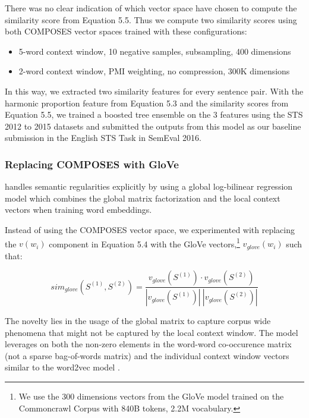 There was no clear indication of which vector space \cite{sultan2015dls} have chosen to compute the similarity score from Equation 5.5. Thus we compute two similarity scores using both COMPOSES vector spaces trained with these configurations:

\begin{itemize}
\item 5-word context window, 10 negative samples, subsampling, 400 dimensions
\item 2-word context window, PMI weighting, no compression, 300K dimensions
\end{itemize}

In this way, we extracted two similarity features for every sentence pair. With the harmonic proportion feature from Equation 5.3 and the similarity scores from Equation 5.5, we trained a boosted tree ensemble on the 3 features using the STS 2012 to 2015 datasets and submitted the outputs from this model as our baseline submission in the English STS Task in SemEval 2016. 

\subsubsection{Replacing COMPOSES with GloVe}

\cite{glove2014} handles semantic regularities \citep{levy2014linguistic} explicitly  by using a global log-bilinear regression model which combines the global matrix factorization and the local context vectors when training word embeddings.

Instead of using the COMPOSES vector space, we experimented with replacing the  $v({ w }_{ i })$ component in Equation 5.4 with the GloVe vectors,\footnote{We use the 300 dimensions vectors from the GloVe model trained on the Commoncrawl Corpus with 840B tokens, 2.2M vocabulary.} $v_{glove}({ w }_{ i })$ such that:

\vspace{-5mm}

\begin{equation}
sim_{glove}({ S }_{  }^{ (1) },{ S }_{  }^{ (2) })=\frac { v_{glove}(S_{  }^{ (1) })\cdot v_{glove}(S_{  }^{ (2) }) }{ |v_{glove}(S_{  }^{ (1) })| \ |v_{glove}(S_{  }^{ (2) })|  } 
\end{equation}

\vspace{2mm}

The novelty lies in the usage of the global matrix to capture corpus wide phenomena that might not be captured by the local context window. The model leverages on both the non-zero elements in the word-word co-occurence matrix (not a sparse bag-of-words matrix) and the individual context window vectors similar to the word2vec model \citep{mikolov2013distributed}. 


